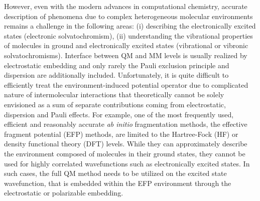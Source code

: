 \documentclass[aip,jcp,preprint,amsmath,amssymb,floatfix]{revtex4-1}
\begin{document}
However, even with the modern advances in computational chemistry, accurate description of phenomena due 
to complex heterogeneous molecular environments remains a challenge in the following areas: (i) describing 
the electronically excited states (electronic solvatochromism),\cite{Barbati.JACS.2014,
Szabla.Sponer.Jiri.Gora.JPCL.2015,Bednarska.Zalesny.Tian.Murugan.Agren.Bartkowiak.Molecules.2017,
Jedrzejewska.Grabarz.Bartkowiak.Osmialowski.SpectChimActA.2018} 
(ii) understanding the vibrational properties of molecules in ground and electronically excited states
(vibrational or vibronic solvatochromisms).\cite{Blasiak.Londergan.Webb.Cho.ACR.2017,
Xu.Blasiak.Cho.Layfield.Londergan.JPCL.2018,Lewis.Gruenke.Oliver.Ballottari.Bassi.Fleming.JPCL.2016} 
Interface between QM and MM levels is usually realized by electrostatic embedding and only rarely 
the Pauli exclusion principle and dispersion are additionally included.\cite{List.Olsen.Kongsted.PCCP.2016}
Unfortunately, it is quite difficult to efficiently treat the environment\hyp{}induced potential operator
due to complicated nature of intermolecular interactions that theoretically cannot be solely envisioned 
as a sum of separate contributions coming from electrostatic, dispersion and Pauli 
effects.\cite{Jeziorski.Moszynski.Szalewicz.ChemRev.1994} 
For example,
one of the most frequently used, efficient and reasonably accurate \emph{ab initio} fragmentation methods, 
the effective fragment potential (EFP) methods, are limited to the Hartree\hyp{}Fock 
(HF)\cite{Roothaan.RevModPhys.1951,Gordon.Smith.Xu.Slipchenko.AnnuRevPhysChem.2013} 
or density functional theory (DFT) levels\cite{Hohenberg.Kohn.PhysRev.1964,Kohn.Sham.PhysRev.1965,Nguyen.Pachter.Day.JCP.2014}.
While they can approximately describe the environment composed of molecules in their ground states,
they cannot be used for highly correlated wavefunctions such as electronically excited states. 
In such cases, the full QM method needs to be utilized on the excited state wavefunction, that is 
embedded within the EFP environment through the electrostatic or polarizable embedding.\cite{Ghosh.JPCA.2017}
\end{document}
